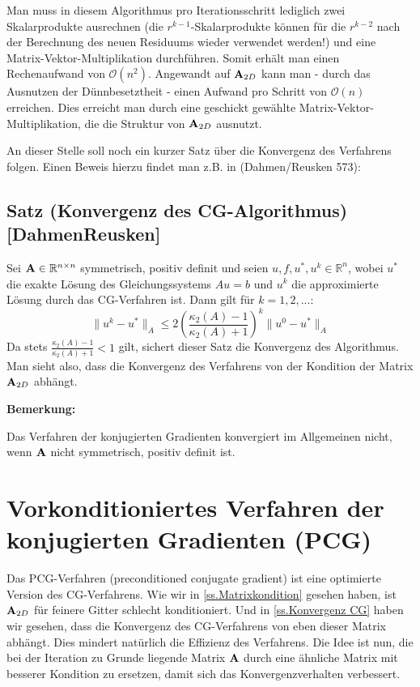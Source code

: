 Man muss in diesem Algorithmus pro Iterationsschritt lediglich zwei Skalarprodukte ausrechnen (die $r^{k-1}$-Skalarprodukte können für die $r^{k-2}$ nach der Berechnung des neuen Residuums wieder verwendet werden!) und eine Matrix-Vektor-Multiplikation durchführen. Somit erhält man einen Rechenaufwand von $\mathcal{O}(n^{2})$. Angewandt auf ${\textbf{A}}_{2D}$ kann man - durch das Ausnutzen der Dünnbesetztheit - einen Aufwand pro Schritt von $\mathcal{O}(n)$ erreichen. Dies erreicht man durch eine geschickt gewählte Matrix-Vektor-Multiplikation, die die Struktur von ${\textbf{A}}_{2D}$ ausnutzt.

An dieser Stelle soll noch ein kurzer Satz über die Konvergenz des Verfahrens folgen. Einen Beweis hierzu findet man z.B. in (Dahmen/Reusken 573):

\subsection{Satz (Konvergenz des CG-Algorithmus) [DahmenReusken]}\label{ss.Konvergenz CG}

Sei ${\textbf{A}} \in \mathbb{R}^{n \times n}$ symmetrisch, positiv definit und seien $u,f,u^{*},u^{k} \in \mathbb{R}^{n}$, wobei $u^{*}$ die exakte Lösung des Gleichungssystems $Au = b$ und $u^{k}$ die approximierte Lösung durch das CG-Verfahren ist. Dann gilt für $k = 1,2,...$:
\begin{equation}
\| u^{k} - u^{*} \|_{A} \le 2 \left( \frac {\kappa_{2} (A) - 1} {\kappa_{2} (A) + 1} \right)^{k} \| u^{0} - u^{*} \|_{A}
\end{equation}
Da stets $\frac {\kappa_{2} (A) - 1} {\kappa_{2} (A) + 1} < 1$ gilt, sichert dieser Satz die Konvergenz des Algorithmus. Man sieht also, dass die Konvergenz des Verfahrens von der Kondition der Matrix ${\textbf{A}}_{2D}$ abhängt.

\textbf{Bemerkung:}

Das Verfahren der konjugierten Gradienten konvergiert im Allgemeinen nicht, wenn ${\textbf{A}}$ nicht symmetrisch, positiv definit ist.

\section{Vorkonditioniertes Verfahren der konjugierten Gradienten (PCG)}\label{s.PCG}

Das PCG-Verfahren (preconditioned conjugate gradient) ist eine optimierte Version des CG-Verfahrens. Wie wir in \autoref{ss.Matrixkondition} gesehen haben, ist ${\textbf{A}}_{2D}$ für feinere Gitter schlecht konditioniert. Und in \autoref{ss.Konvergenz CG} haben wir gesehen, dass die Konvergenz des CG-Verfahrens von eben dieser Matrix abhängt. Dies mindert natürlich die Effizienz des Verfahrens. Die Idee ist nun, die bei der Iteration zu Grunde liegende Matrix ${\textbf{A}}$ durch eine ähnliche Matrix mit besserer Kondition zu ersetzen, damit sich das Konvergenzverhalten verbessert.

